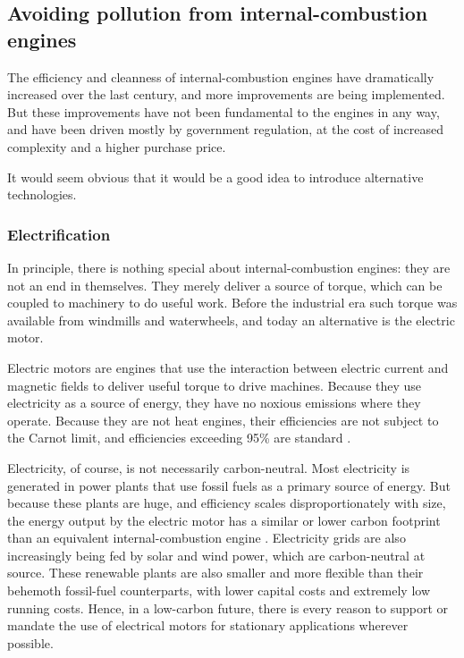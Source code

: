 \subsection{Avoiding pollution from internal\hyp{}combustion engines} \label{par:carbon-neutral}

The efficiency and cleanness of internal\hyp{}combustion engines have
dramatically increased over the last century, and more improvements are being
implemented. But these improvements have not been fundamental to the engines in
any way, and have been driven mostly by government regulation, at the cost of
increased complexity and a higher purchase price.

It would seem obvious that it would be a good idea to introduce alternative
technologies. 

\subsubsection{Electrification}

In principle, there is nothing special about internal\hyp{}combustion engines:
they are not an end in themselves. They mere\-ly deliver a source of torque,
which can be coupled to machinery to do useful work. Before the industrial era
such torque was available from windmills and waterwheels, and today an
alternative is the electric motor.

Electric motors are engines that use the interaction between electric current
and magnetic fields to deliver useful torque to drive machines. Because they use
electricity as a source of energy, they have no noxious emissions where they
operate. Because they are not heat engines, their efficiencies are not subject
to the Carnot limit, and efficiencies exceeding 95\% are standard \autocite{Li2012}.

Electricity, of course, is not necessarily carbon-neutral. Most electricity is
generated in power plants that use fossil fuels as a primary source of energy.
But because these plants are huge, and efficiency scales disproportionately with
size, the energy output by the electric motor has a similar or lower carbon
footprint than an equivalent internal\hyp{}combustion engine
\autocite{Doucette2011}. Electricity grids are also increasingly being fed by
solar and wind power, which are carbon-neutral at source. These renewable plants
are also smaller and more flexible than their behemoth fossil-fuel counterparts,
with lower capital costs and extremely low running costs. Hence, in a low-carbon
future, there is every reason to support or mandate the use of electrical motors
for stationary applications wherever possible.

